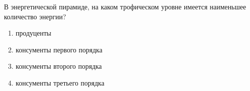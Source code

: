 
В
энергетической пирамиде, на каком трофическом уровне имеется наименьшее
количество энергии?

\begin{enumerate}
    \item продуценты 
    \item консументы первого порядка  
    \item консументы второго порядка 
    \item консументы третьего порядка
\end{enumerate}

\explanationSection


